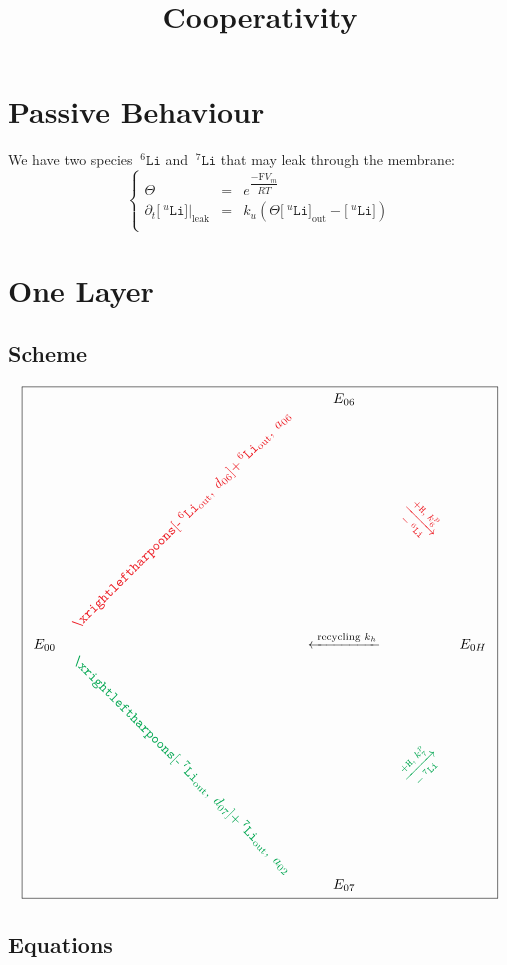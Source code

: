 \documentclass[aps,onecolumn,11pt]{revtex4}
\newcommand{\mychem}[1]{\mathtt{#1}}
\newcommand{\myconc}[1]{\big[#1\big]}
\newcommand{\Faraday}{\mathrm{F}}
\newcommand{\spLi}[1]{{\!~^{#1}\mychem{Li}}}
\newcommand{\Li}[1]{\myconc{\spLi{#1}}}
\newcommand{\spproton}{\mychem{H}}
\newcommand{\myleak}[1]{\left.{#1}\right\vert_{\mathrm{leak}}}
\newcommand{\myout}[1]{{#1}_{\mathrm{out}}}
\newcommand{\LiOut}[1]{\myout{\Li{#1}}}
\newcommand{\spLiOut}[1]{\myout{\spLi{#1}}}
\newcommand{\myrotate}[2]{\rotatebox[origin=c]{#1}{#2}}
\newcommand{\outLi}[1]{\text{-}\spLiOut{#1}}
\newcommand{\mycolor}[2]{\ifthenelse{\equal{#1}{6}}{{\color{Red}#2}}{{\color{Green}#2}}}
\begin{document}
\title{Cooperativity}
\maketitle

\section{Passive Behaviour}
We have two species $\spLi{6}$ and $\spLi{7}$ that may leak through the membrane:
\begin{equation}
\left\lbrace
\begin{array}{rcl}
	\Theta    & = & e^{\dfrac{-\Faraday V_m }{RT}} \\
	\partial_t \myleak{\Li{u}} & = & k_u \left( \Theta \LiOut{u} - \Li{u}\right)\\
\end{array}
\right.
\end{equation}

\section{One Layer}

\subsection{Scheme}
{
\Large
\begin{equation}
\boxed{
\begin{array}{ccccc}
 & & E_{06}  &  & \\
 &  \mycolor{6}{\myrotate{45}{$\xrightleftharpoons[\outLi{6},\;d_{06}]{+\spLiOut{6},\;a_{06}}$}} &   & \mycolor{6}{\myrotate{-45}{$\xrightarrow[-\spLi{6}]{+ \spproton, \; k^p_6}$}} &  \\
E_{00}  &  & \xleftarrow{\text{ recycling } k_h } &   & E_{0H} \\
  & \mycolor{7}{\myrotate{-45}{$\xrightleftharpoons[\outLi{7},\;d_{07}]{+\spLiOut{7},\;a_{02}}$}} &   & \mycolor{7}{\myrotate{+45}{$\xrightarrow[-\spLi{7}]{+ \spproton, \; k^p_7}$}} & \\
 & & E_{07} & & \\
 \end{array}
 }
\end{equation}
}

\subsection{Equations}
\end{document}
